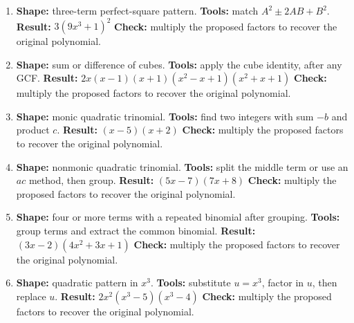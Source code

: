 \documentclass[11pt,oneside]{book}
\begin{document}
\begin{enumerate}[leftmargin=*,label=\textbf{CAP\arabic*.},itemsep=0.45\baselineskip]
\item \textbf{Shape:} three-term perfect-square pattern. \textbf{Tools:} match $A^2\pm2AB+B^2$. \textbf{Result:} $ 3 \left(9 x^{3} + 1\right)^{2} $ \textbf{Check:} multiply the proposed factors to recover the original polynomial.
\item \textbf{Shape:} sum or difference of cubes. \textbf{Tools:} apply the cube identity, after any GCF. \textbf{Result:} $ 2 x \left(x - 1\right) \left(x + 1\right) \left(x^{2} - x + 1\right) \left(x^{2} + x + 1\right) $ \textbf{Check:} multiply the proposed factors to recover the original polynomial.
\item \textbf{Shape:} monic quadratic trinomial. \textbf{Tools:} find two integers with sum $-b$ and product $c$. \textbf{Result:} $ \left(x - 5\right) \left(x + 2\right) $ \textbf{Check:} multiply the proposed factors to recover the original polynomial.
\item \textbf{Shape:} nonmonic quadratic trinomial. \textbf{Tools:} split the middle term or use an $ac$ method, then group. \textbf{Result:} $ \left(5 x - 7\right) \left(7 x + 8\right) $ \textbf{Check:} multiply the proposed factors to recover the original polynomial.
\item \textbf{Shape:} four or more terms with a repeated binomial after grouping. \textbf{Tools:} group terms and extract the common binomial. \textbf{Result:} $ \left(3 x - 2\right) \left(4 x^{2} + 3 x + 1\right) $ \textbf{Check:} multiply the proposed factors to recover the original polynomial.
\item \textbf{Shape:} quadratic pattern in $x^3$. \textbf{Tools:} substitute $u=x^3$, factor in $u$, then replace $u$. \textbf{Result:} $ 2 x^{2} \left(x^{3} - 5\right) \left(x^{3} - 4\right) $ \textbf{Check:} multiply the proposed factors to recover the original polynomial.
\end{enumerate}
\end{document}
